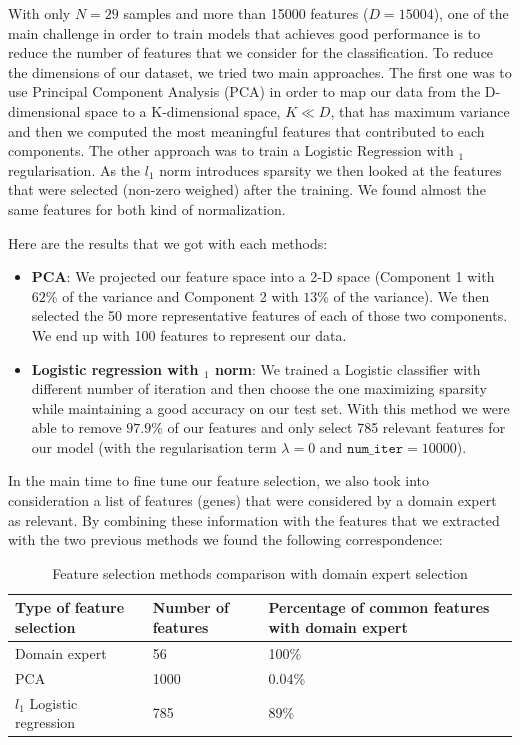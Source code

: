 \documentclass[10pt,conference,compsocconf]{IEEEtran}
\begin{document}
With only $N=29$ samples and more than 15000 features ($D = 15004$), one of the main challenge in order to train models that achieves good performance is to reduce the number of features that we consider for the classification. To reduce the dimensions of our dataset, we tried two main approaches. The first one was to use Principal Component Analysis (PCA) in order to map our data from the D-dimensional space to a K-dimensional space, $K \ll D$, that has maximum variance and then we computed the most meaningful features that contributed to each components. The other approach was to train a Logistic Regression with $_1$ regularisation. As the $l_1$ norm introduces sparsity we then looked at the features that were selected (non-zero weighed) after the training. We found almost the same features for both kind of normalization.

Here are the results that we got with each methods:
\begin{itemize}
    \item 
    \textbf{PCA}: We projected our feature space into a 2-D space (Component 1 with $62\%$ of the variance and Component 2 with $13\%$ of the variance). We then selected the 50 more representative features of each of those two components. We end up with 100 features to represent our data.
    \item 
    \textbf{Logistic regression with $_1$ norm}: We trained a Logistic classifier with different number of iteration and then choose the one maximizing sparsity while maintaining a good accuracy on our test set. With this method we were able to remove $97.9\%$ of our features and only select 785 relevant features for our model (with the regularisation term $\lambda=0$ and $\texttt{num\_iter}=10000$).
\end{itemize}

In the main time to fine tune our feature selection, we also took into consideration a list of features (genes) that were considered by a domain expert as relevant. By combining these information with the features that we extracted with the two previous methods we found the following correspondence:

\begin{table}[H]
    \centering
    \begin{tabular}{|p{3cm}|p{1.5cm}|p{2.6cm}|}
        \hline
          \textbf{Type of feature selection} & \textbf{Number of features} & \textbf{Percentage of common features with domain expert} \\
         \hline
           Domain expert & 56 & 100\%\\
           \hline
           PCA & 1000 & 0.04\%\\
           \hline
           $l_1$ Logistic regression & 785 & 89\%\\
         \hline
    \end{tabular}
    \caption{Feature selection methods comparison with domain expert selection}
    \label{tab:feature_selection_table}
\end{table}
\end{document}
